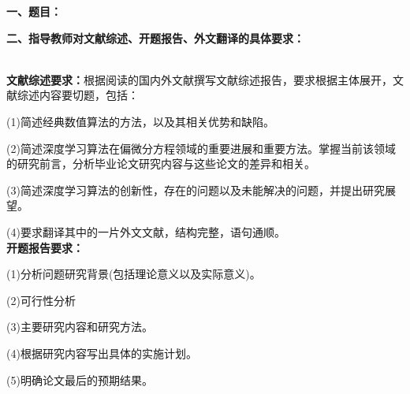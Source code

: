 {
    \setlength{\parindent}{0em}
    \par {\bfseries 一、题目：\Title}
    \\
    \par {\bfseries 二、指导教师对文献综述、开题报告、外文翻译的具体要求：}
}
\\
\textbf{文献综述要求：}根据阅读的国内外文献撰写文献综述报告，要求根据主体展开，文献综述内容要切题，包括：

(1)简述经典数值算法的方法，以及其相关优势和缺陷。

(2)简述深度学习算法在偏微分方程领域的重要进展和重要方法。掌握当前该领域的研究前言，分析毕业论文研究内容与这些论文的差异和相关。

(3)简述深度学习算法的创新性，存在的问题以及未能解决的问题，并提出研究展望。

(4)要求翻译其中的一片外文文献，结构完整，语句通顺。
\\
\textbf{开题报告要求：}

(1)分析问题研究背景(包括理论意义以及实际意义)。

(2)可行性分析

(3)主要研究内容和研究方法。

(4)根据研究内容写出具体的实施计划。

(5)明确论文最后的预期结果。
\mbox{} \vfill

\signature{指导教师（签名）}
